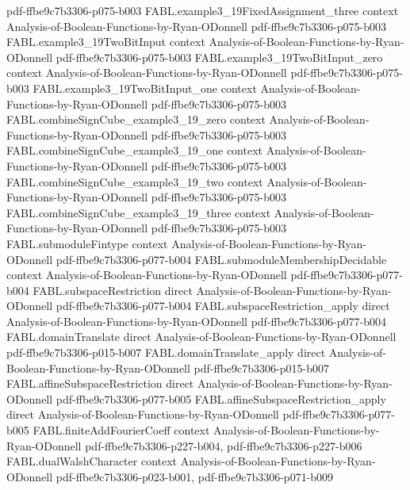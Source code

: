 \begin{theorem}
  {pdf-ffbe9c7b3306-p075-b003}
\proofstep
  {FABL.example3_19FixedAssignment_three}
  {context}
  {Analysis-of-Boolean-Functions-by-Ryan-ODonnell}
  {pdf-ffbe9c7b3306-p075-b003}
\proofstep
  {FABL.example3_19TwoBitInput}
  {context}
  {Analysis-of-Boolean-Functions-by-Ryan-ODonnell}
  {pdf-ffbe9c7b3306-p075-b003}
\proofstep
  {FABL.example3_19TwoBitInput_zero}
  {context}
  {Analysis-of-Boolean-Functions-by-Ryan-ODonnell}
  {pdf-ffbe9c7b3306-p075-b003}
\proofstep
  {FABL.example3_19TwoBitInput_one}
  {context}
  {Analysis-of-Boolean-Functions-by-Ryan-ODonnell}
  {pdf-ffbe9c7b3306-p075-b003}
\proofstep
  {FABL.combineSignCube_example3_19_zero}
  {context}
  {Analysis-of-Boolean-Functions-by-Ryan-ODonnell}
  {pdf-ffbe9c7b3306-p075-b003}
\proofstep
  {FABL.combineSignCube_example3_19_one}
  {context}
  {Analysis-of-Boolean-Functions-by-Ryan-ODonnell}
  {pdf-ffbe9c7b3306-p075-b003}
\proofstep
  {FABL.combineSignCube_example3_19_two}
  {context}
  {Analysis-of-Boolean-Functions-by-Ryan-ODonnell}
  {pdf-ffbe9c7b3306-p075-b003}
\proofstep
  {FABL.combineSignCube_example3_19_three}
  {context}
  {Analysis-of-Boolean-Functions-by-Ryan-ODonnell}
  {pdf-ffbe9c7b3306-p075-b003}
\proofstep
  {FABL.submoduleFintype}
  {context}
  {Analysis-of-Boolean-Functions-by-Ryan-ODonnell}
  {pdf-ffbe9c7b3306-p077-b004}
\proofstep
  {FABL.submoduleMembershipDecidable}
  {context}
  {Analysis-of-Boolean-Functions-by-Ryan-ODonnell}
  {pdf-ffbe9c7b3306-p077-b004}
\proofstep
  {FABL.subspaceRestriction}
  {direct}
  {Analysis-of-Boolean-Functions-by-Ryan-ODonnell}
  {pdf-ffbe9c7b3306-p077-b004}
\proofstep
  {FABL.subspaceRestriction_apply}
  {direct}
  {Analysis-of-Boolean-Functions-by-Ryan-ODonnell}
  {pdf-ffbe9c7b3306-p077-b004}
\proofstep
  {FABL.domainTranslate}
  {direct}
  {Analysis-of-Boolean-Functions-by-Ryan-ODonnell}
  {pdf-ffbe9c7b3306-p015-b007}
\proofstep
  {FABL.domainTranslate_apply}
  {direct}
  {Analysis-of-Boolean-Functions-by-Ryan-ODonnell}
  {pdf-ffbe9c7b3306-p015-b007}
\proofstep
  {FABL.affineSubspaceRestriction}
  {direct}
  {Analysis-of-Boolean-Functions-by-Ryan-ODonnell}
  {pdf-ffbe9c7b3306-p077-b005}
\proofstep
  {FABL.affineSubspaceRestriction_apply}
  {direct}
  {Analysis-of-Boolean-Functions-by-Ryan-ODonnell}
  {pdf-ffbe9c7b3306-p077-b005}
\proofstep
  {FABL.finiteAddFourierCoeff}
  {context}
  {Analysis-of-Boolean-Functions-by-Ryan-ODonnell}
  {pdf-ffbe9c7b3306-p227-b004,
    pdf-ffbe9c7b3306-p227-b006}
\proofstep
  {FABL.dualWalshCharacter}
  {context}
  {Analysis-of-Boolean-Functions-by-Ryan-ODonnell}
  {pdf-ffbe9c7b3306-p023-b001,
    pdf-ffbe9c7b3306-p071-b009}

\end{theorem}
